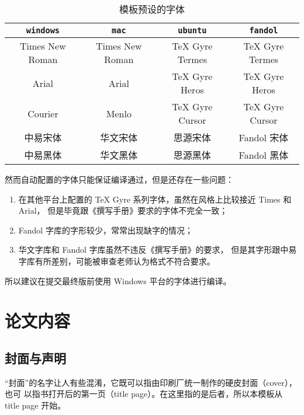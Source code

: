 \documentclass[a4paper]{ltxdoc}
\DeclareRobustCommand\opt{\texttt}
\begin{document}
\begin{table}[htb]
  \centering
  \caption{模板预设的字体}
  \label{tab:fontset}
  \begin{tabular}{cccc}
    \toprule
    \opt{windows} & \opt{mac}    & \opt{ubuntu} & \opt{fandol} \\
    \midrule
    Times New Roman  & Times New Roman & TeX Gyre Termes & TeX Gyre Termes \\
    Arial            & Arial           & TeX Gyre Heros  & TeX Gyre Heros  \\
    Courier          & Menlo           & TeX Gyre Cursor & TeX Gyre Cursor \\
    中易宋体         & 华文宋体        & 思源宋体        & Fandol 宋体     \\
    中易黑体         & 华文黑体        & 思源黑体        & Fandol 黑体     \\
    \bottomrule
  \end{tabular}
\end{table}

然而自动配置的字体只能保证编译通过，但是还存在一些问题：
\begin{enumerate}
  \item 在其他平台上配置的 TeX Gyre 系列字体，虽然在风格上比较接近 Times 和 Arial，
    但是毕竟跟《撰写手册》要求的字体不完全一致；
  \item Fandol 字库的字形较少，常常出现缺字的情况；
  \item 华文字库和 Fandol 字库虽然不违反《撰写手册》的要求，
    但是其字形跟中易字库有所差别，可能被审查老师认为格式不符合要求。
\end{enumerate}

所以建议在提交最终版前使用 Windows 平台的字体进行编译。



\section{论文内容}

\subsection{封面与声明}

“封面”的名字让人有些混淆，它既可以指由印刷厂统一制作的硬皮封面（cover），也可
以指书打开后的第一页（title page）。在这里指的是后者，所以本模板从 title page
开始。
\end{document}
